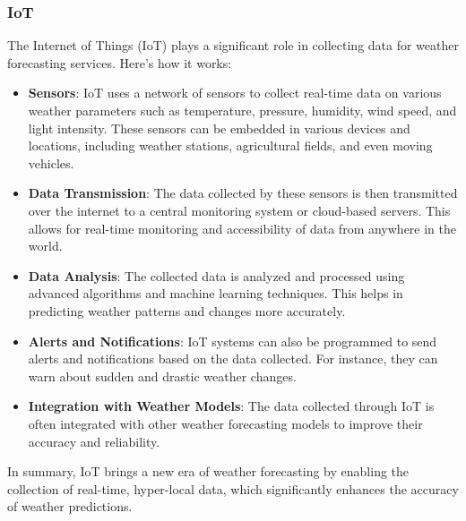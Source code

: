 \documentclass[../paper.tex]{subfiles}
\begin{document}
    \subsubsection{IoT}
    The Internet of Things (IoT) plays a significant role in collecting data for weather forecasting services.
    Here's how it works:
    \begin{itemize}
        \item \textbf{Sensors}: IoT uses a network of sensors to collect real-time data on various weather parameters such as temperature, pressure, humidity, wind speed, and light intensity\cite{iot1, iot4}.
        These sensors can be embedded in various devices and locations, including weather stations, agricultural fields, and even moving vehicles\cite{iot1, iot4}.
        \item \textbf{Data Transmission}: The data collected by these sensors is then transmitted over the internet to a central monitoring system or cloud-based servers\cite{iot1, iot3}.
        This allows for real-time monitoring and accessibility of data from anywhere in the world\cite{iot1}.
        \item \textbf{Data Analysis}: The collected data is analyzed and processed using advanced algorithms and machine learning techniques.
        This helps in predicting weather patterns and changes more accurately\cite{iot1, iot3}.
        \item \textbf{Alerts and Notifications}: IoT systems can also be programmed to send alerts and notifications based on the data collected.
        For instance, they can warn about sudden and drastic weather changes\cite{iot1}.
        \item \textbf{Integration with Weather Models}: The data collected through IoT is often integrated with other weather forecasting models to improve their accuracy and reliability\cite{iot3}.
    \end{itemize}

    In summary, IoT brings a new era of weather forecasting by enabling the collection of real-time, hyper-local data, which significantly enhances the accuracy of weather predictions\cite{iot4}.
\end{document}

